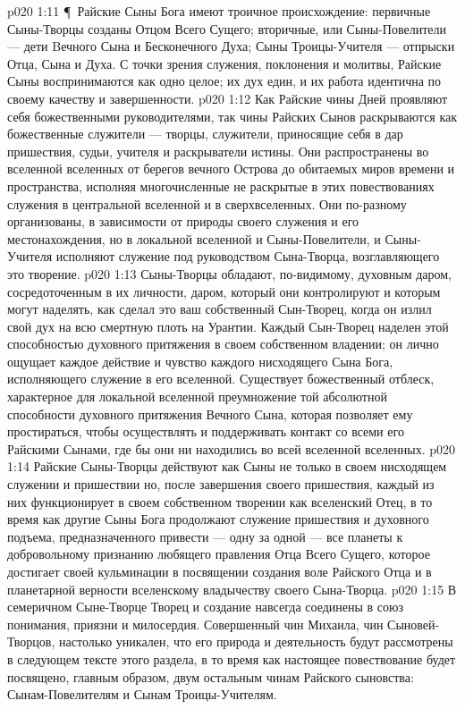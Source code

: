 \vs p020 1:11 \P\ Райские Сыны Бога имеют троичное происхождение: первичные Сыны\hyp{}Творцы созданы Отцом Всего Сущего; вторичные, или Сыны\hyp{}Повелители --- дети Bечного Сына и Бесконечного Духа; Сыны Троицы\hyp{}Учителя --- отпрыски Отца, Сына и Духа. С точки зрения служения, поклонения и молитвы, Райские Сыны воспринимаются как одно целое; их дух един, и их работа идентична по своему качеству и завершенности.
\vs p020 1:12 Как Райские чины Дней проявляют себя божественными руководителями, так чины Райских Сынов раскрываются как божественные служители --- творцы, служители, приносящие себя в дар пришествия, судьи, учителя и раскрыватели истины. Они распространены во вселенной вселенных от берегов вечного Острова до обитаемых миров времени и пространства, исполняя многочисленные не раскрытые в этих повествованиях служения в центральной вселенной и в сверхвселенных. Они по\hyp{}разному организованы, в зависимости от природы своего служения и его местонахождения, но в локальной вселенной и Сыны\hyp{}Повелители, и Сыны\hyp{}Учителя исполняют служение под руководством Сына\hyp{}Творца, возглавляющего это творение.
\vs p020 1:13 Сыны\hyp{}Творцы обладают, по\hyp{}видимому, духовным даром, сосредоточенным в их личности, даром, который они контролируют и которым могут наделять, как сделал это ваш собственный Сын\hyp{}Творец, когда он излил свой дух на всю смертную плоть на Урантии. Каждый Сын\hyp{}Творец наделен этой способностью духовного притяжения в своем собственном владении; он лично ощущает каждое действие и чувство каждого нисходящего Сына Бога, исполняющего служение в его вселенной. Существует божественный отблеск, характерное для локальной вселенной преумножение той абсолютной способности духовного притяжения Вечного Сына, которая позволяет ему простираться, чтобы осуществлять и поддерживать контакт со всеми его Райскими Сынами, где бы они ни находились во всей вселенной вселенных.
\vs p020 1:14 Райские Сыны\hyp{}Творцы действуют как Сыны не только в своем нисходящем служении и пришествии но, после завершения своего пришествия, каждый из них функционирует в своем собственном творении как вселенский Отец, в то время как другие Сыны Бога продолжают служение пришествия и духовного подъема, предназначенного привести --- одну за одной --- все планеты к добровольному признанию любящего правления Отца Всего Сущего, которое достигает своей кульминации в посвящении создания воле Райского Отца и в планетарной верности вселенскому владычеству своего Сына\hyp{}Творца.
\vs p020 1:15 В семеричном Сыне\hyp{}Творце Творец и создание навсегда соединены в союз понимания, приязни и милосердия. Совершенный чин Михаила, чин Сыновей\hyp{}Творцов, настолько уникален, что его природа и деятельность будут рассмотрены в следующем тексте этого раздела, в то время как настоящее повествование будет посвящено, главным образом, двум остальным чинам Райского сыновства: Сынам\hyp{}Повелителям и Сынам Троицы\hyp{}Учителям.
